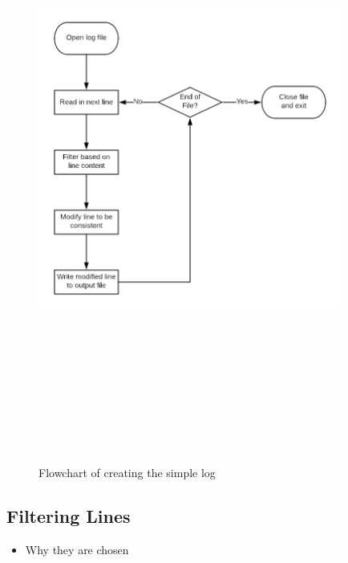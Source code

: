 \begin{figure}
    \begin{centering}
        \includegraphics[width=10cm,height=20cm,keepaspectratio]{Figures/Chapter5-SimpleLogFlowchart.png}
        \caption{Flowchart of creating the simple log}
        \label{fig:chapter5SimpleFlowchart}
    \end{centering}
\end{figure}

\subsection{Filtering Lines}\label{filteringLines}
\begin{itemize}
    \item Why they are chosen
\end{itemize}

